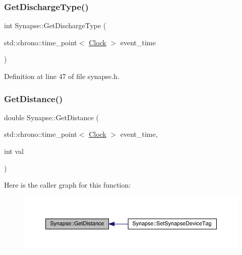 \subsubsection{\texorpdfstring{Get\+Discharge\+Type()}{GetDischargeType()}}
{\footnotesize\ttfamily int Synapse\+::\+Get\+Discharge\+Type (\begin{DoxyParamCaption}\item[{std\+::chrono\+::time\+\_\+point$<$ \hyperlink{universe_8h_a0ef8d951d1ca5ab3cfaf7ab4c7a6fd80}{Clock} $>$}]{event\+\_\+time }\end{DoxyParamCaption})\hspace{0.3cm}{\ttfamily [inline]}}



Definition at line 47 of file synapse.\+h.

\mbox{\label{class_synapse_a0a0a100802e6662ecf18d39bf2a52d98}} 
\subsubsection{\texorpdfstring{Get\+Distance()}{GetDistance()}}
{\footnotesize\ttfamily double Synapse\+::\+Get\+Distance (\begin{DoxyParamCaption}\item[{std\+::chrono\+::time\+\_\+point$<$ \hyperlink{universe_8h_a0ef8d951d1ca5ab3cfaf7ab4c7a6fd80}{Clock} $>$}]{event\+\_\+time,  }\item[{int}]{val }\end{DoxyParamCaption})}

Here is the caller graph for this function\+:\nopagebreak
\begin{figure}[H]
\begin{center}
\leavevmode
\includegraphics[width=350pt]{class_synapse_a0a0a100802e6662ecf18d39bf2a52d98_icgraph}
\end{center}
\end{figure}
\mbox{\label{class_synapse_a58659a5134815f7a6e06eb5c60e9033f}} 
